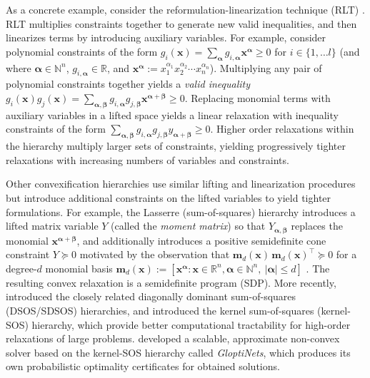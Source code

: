 \documentclass[10pt]{article} %
\theoremstyle{plain}
\theoremstyle{definition}
\theoremstyle{remark}
\begin{document}
As a concrete example, consider the reformulation-linearization technique (RLT) \citep{sherali2013reformulation}.
RLT multiplies constraints together to generate new valid inequalities, and then linearizes terms by introducing auxiliary variables.
For example, consider polynomial constraints of the form 
$g_i(\mathbf{x}) = \sum_{\bm{\alpha}} g_{i,\bm{\alpha}} \mathbf{x}^{\bm{\alpha}} \geq 0$ for $i \in \{1, \dots l\}$ (and where $\bm{\alpha} \in \mathbb{N}^n$, $g_{i, \bm{\alpha}} \in \mathbb{R}$, and $\mathbf{x}^{\bm{\alpha}} := x_1^{\alpha_1} x_2^{\alpha_2} \cdots x_n^{\alpha_n}$).
Multiplying any pair of polynomial constraints together yields a \textit{valid inequality}
$
g_i(\mathbf{x}) g_j(\mathbf{x}) 
= \sum_{\bm{\alpha}, \bm{\beta}} g_{i,\bm{\alpha}} g_{j,\bm{\beta}} \mathbf{x}^{\bm{\alpha} + \bm{\beta}} \geq 0.
$
Replacing monomial terms with auxiliary variables in a lifted space yields a linear relaxation with inequality constraints of the form
$
\sum_{\bm{\alpha}, \bm{\beta}} g_{i, \bm{\alpha}} g_{j, \bm{\beta}} y_{\bm{\alpha}+\bm{\beta}} \geq 0.
$
Higher order relaxations within the hierarchy multiply larger sets of constraints, yielding progressively tighter relaxations with increasing numbers of variables and constraints. 

Other convexification hierarchies use similar lifting and linearization procedures but introduce additional constraints on the lifted variables to yield tighter formulations. For example, the Lasserre (sum-of-squares) hierarchy introduces a lifted matrix variable $Y$ (called the \textit{moment matrix}) so that $Y_{\bm{\alpha}, \bm{\beta}}$ replaces the monomial $\mathbf{x}^{\bm{\alpha} + \bm{\beta}}$, and additionally introduces a positive semidefinite cone constraint $Y \succeq 0$ motivated by the observation that $\mathbf{m}_d(\mathbf{x}) \, \mathbf{m}_d(\mathbf{x})^\top \succeq 0$ for a degree-$d$ monomial basis $\mathbf{m}_d(\mathbf{x}) := [\mathbf{x}^{\bm{\alpha}}: \mathbf{x} \in \mathbb{R}^n, \bm{\alpha} \in \mathbb{N}^n,~ |\bm{\alpha}|\leq d]$ \citep{lasserre2001global}. The resulting convex relaxation is a semidefinite program (SDP). More recently, \citet{ahmadi2016some} introduced the closely related diagonally dominant sum-of-squares (DSOS/SDSOS) hierarchies, and \citet{rudi2020finding} introduced the kernel sum-of-squares (kernel-SOS) hierarchy, which provide better computational tractability for high-order relaxations of large problems. \citet{beugnot2023gloptinetsscalablenonconvexoptimization} developed a scalable, approximate non-convex solver based on the kernel-SOS hierarchy called \textit{GloptiNets}, which produces its own probabilistic optimality certificates for obtained solutions.
\end{document}

